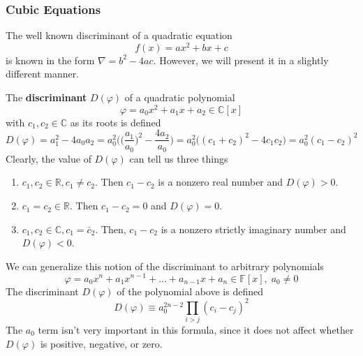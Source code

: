 \documentclass{article}
\begin{document}
    \subsubsection{Cubic Equations}

      The well known discriminant of a quadratic equation 
      \begin{equation}
        f(x) = ax^2 + bx + c
      \end{equation}
      is known in the form $\nabla = b^2 - 4ac$. However, we will present it in a slightly different manner. 

      \begin{definition}
        The \textbf{discriminant} $D(\varphi)$ of a quadratic polynomial
        \begin{equation}
          \varphi = a_0 x^2 + a_1 x + a_2 \in \mathbb{C}[x]
        \end{equation}
        with $c_1, c_2 \in \mathbb{C}$ as its roots is defined
        \begin{equation}
          D(\varphi) = a_1^2 - 4 a_0 a_2 = a_0^2 \bigg( \Big(\frac{a_1}{a_0} \Big)^2 - \frac{4 a_2}{a_0} \bigg) = a_0^2 \big( (c_1 + c_2)^2 - 4 c_1 c_2 \big) = a_0^2 (c_1 - c_2)^2
        \end{equation}
        Clearly, the value of $D(\varphi)$ can tell us three things
        \begin{enumerate}
          \item $c_1, c_2 \in \mathbb{R}, c_1 \neq c_2$. Then $c_1 - c_2$ is a nonzero real number and $D(\varphi) > 0$. 
          \item $c_1 = c_2 \in \mathbb{R}$. Then $c_1 - c_2 = 0$ and $D(\varphi) = 0$. 
          \item $c_1, c_2 \in \mathbb{C}, c_1 = \bar{c}_2$. Then, $c_1 - c_2$ is a nonzero strictly imaginary number and $D(\varphi) < 0$. 
        \end{enumerate}
      \end{definition}

      \begin{definition}
        We can generalize this notion of the discriminant to arbitrary polynomials
        \begin{equation}
          \varphi = a_0 x^n + a_1 x^{n-1} + ... + a_{n-1} x + a_n \in \mathbb{F}[x], \; a_0 \neq 0
        \end{equation}
        The discriminant $D(\varphi)$ of the polynomial above is defined
        \begin{equation}
          D(\varphi) \equiv a_0^{2n-2} \prod_{i>j} (c_i - c_j)^2
        \end{equation}
        The $a_0$ term isn't very important in this formula, since it does not affect whether $D(\varphi)$ is positive, negative, or zero. 
      \end{definition}
\end{document}
